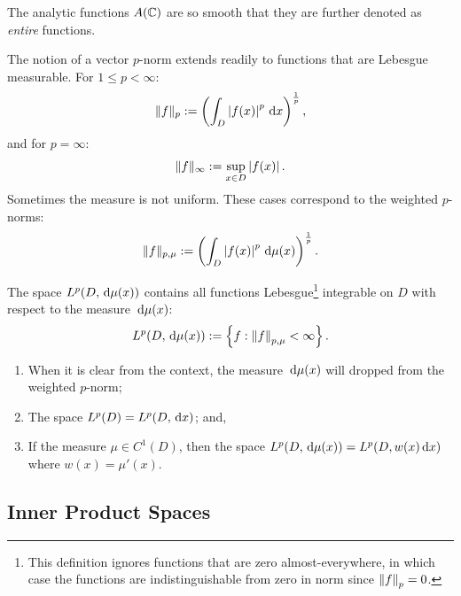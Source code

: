 The analytic functions $A(\mathbb{C})$ are so smooth that they are further denoted as {\em entire} functions.

The notion of a vector $p$-norm extends readily to functions that are Lebesgue measurable. For $1\le p < \infty$:
\begin{equation}
\|f\|_p := \left(\int_D\left|{f(x)}\right|^p{\rm\,d} x\right)^{\frac{1}{p}},
\end{equation}
and for $p=\infty$:
\begin{equation}
\|f\|_\infty := \sup_{x\in D} \left|{f(x)}\right|.
\end{equation}
Sometimes the measure is not uniform. These cases correspond to the weighted $p$-norms:
\begin{equation}
\|f\|_{p,\mu} := \left(\int_D\left|{f(x)}\right|^p{\rm\,d}\mu(x)\right)^{\frac{1}{p}}.
\end{equation}

\begin{definition}
The space $L^p(D,{\rm\,d}\mu(x))$ contains all functions Lebesgue\footnote{This definition ignores functions that are zero almost-everywhere, in which case the functions are indistinguishable from zero in norm since $\left\|{f}\right\|_p=0$.} integrable on $D$ with respect to the measure ${\rm\,d}\mu(x)$:
\begin{equation}
L^p(D,{\rm\,d}\mu(x)) := \left\{ f : \left\|{f}\right\|_{p,\mu} < \infty \right\}.
\end{equation}
\end{definition}

\begin{remark}
\begin{enumerate}
\item When it is clear from the context, the measure ${\rm\,d}\mu(x)$ will dropped from the weighted $p$-norm;
\item The space $L^p(D) = L^p(D,{\rm\,d} x)$; and,
\item If the measure $\mu \in C^1(D)$, then the space $L^p(D,{\rm\,d}\mu(x)) = L^p(D,w(x){\rm\,d}x)$ where $w(x) = \mu'(x)$.
\end{enumerate}
\end{remark}

\subsection{Inner Product Spaces}

